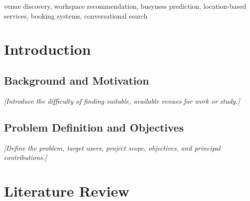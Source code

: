 ﻿\documentclass[conference,a4paper]{IEEEtran}
\newif\ifshowguidance
\newcommand{\guidance}[1]{%
  \ifshowguidance
    \par\smallskip
    \noindent\fcolorbox{gray}{gray!8}{%
      \parbox{\dimexpr\columnwidth-2\fboxsep-2\fboxrule\relax}{%
        \footnotesize\color{gray!75!black}\textbf{Draft guidance:} #1}}
    \par\smallskip
  \fi
}
\begin{document}
\begin{abstract}
\guidance{Target: approximately 150--200 words (about 0.25--0.30 page).
State the problem and objective, the integrated methodology, the principal
quantitative or evaluative results, and the main contribution or innovation.
Avoid citations and undefined abbreviations.}
\textit{[Insert the final abstract here.]}
\end{abstract}

\begin{IEEEkeywords}
venue discovery, workspace recommendation, busyness prediction,
location-based services, booking systems, conversational search
\end{IEEEkeywords}

\section{Introduction}
\label{sec:introduction}
\guidance{Target: 0.60--0.70 page. Establish the motivation and context,
define the user problem, identify the gap, state the project objectives and
research or engineering questions, summarise the contribution, and end with
a brief paper roadmap.}

\subsection{Background and Motivation}
\textit{[Introduce the difficulty of finding suitable, available venues for
work or study.]}

\subsection{Problem Definition and Objectives}
\textit{[Define the problem, target users, project scope, objectives, and
principal contributions.]}

\section{Literature Review}
\label{sec:literature-review}
\guidance{Target: 1.20--1.30 pages. Critically compare relevant scientific
literature and similar platforms. Cover location-based venue discovery,
context-aware or multi-criteria recommendation, busyness estimation,
booking systems, and conversational search. Conclude by identifying the
specific gap addressed by Plug \& Wifi.}
\end{document}
